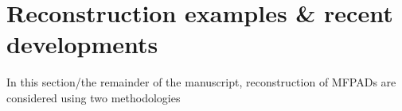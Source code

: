 \section{Reconstruction examples & recent developments}

In this section/the remainder of the manuscript, reconstruction of MFPADs are considered using two methodologies
